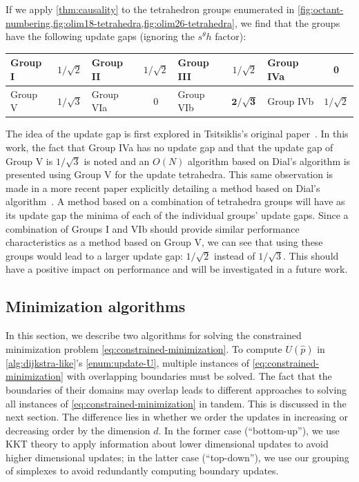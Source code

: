 \documentclass[eikonal.tex]{subfiles}
\begin{document}
If we apply \cref{thm:causality} to the tetrahedron groups enumerated
in
\cref{fig:octant-numbering,fig:olim18-tetrahedra,fig:olim26-tetrahedra},
we find that the groups have the following update gaps (ignoring the
$s^\theta h$ factor):
\vspace{0.5em}
\begin{center}
  \begin{tabular}{lc|lc|lc|lc}
    Group I & $1/\sqrt{2}$ & Group II & $1/\sqrt{2}$ & Group III & $1/\sqrt{2}$ & Group IVa & 0 \\
    \midrule
    Group V & $1/\sqrt{3}$ & Group VIa & 0 & Group VIb & $\boldsymbol{2/\sqrt{3}}$ & Group IVb & $1/\sqrt{2}$
  \end{tabular}
\end{center}
\vspace{0.5em} The idea of the update gap is first explored in
Tsitsiklis's original paper~\cite{tsitsiklis1995efficient}. In this
work, the fact that Group IVa has no update gap and that the update
gap of Group V is $1/\sqrt{3}$ is noted and an $O(N)$ algorithm based
on Dial's algorithm is presented using Group V for the update
tetrahedra. This same observation is made in a more recent paper
explicitly detailing a method based on Dial's
algorithm~\cite{kim2001calo}. A method based on a combination of
tetrahedra groups will have as its update gap the minima of each of
the individual groups' update gaps. Since a combination of Groups I
and VIb should provide similar performance characteristics as a method
based on Group V, we can see that using these groups would lead to a
larger update gap: $1/\sqrt{2}$ instead of $1/\sqrt{3}$. This should
have a positive impact on performance and will be investigated in a
future work.

\subsection[Optimization algorithms]{Minimization algorithms}

In this section, we describe two algorithms for solving the
constrained minimization problem
\cref{eq:constrained-minimization}. To compute $U(\hat{p})$ in
\cref{alg:dijkstra-like}'s \cref{enum:update-U}, multiple instances of
\cref{eq:constrained-minimization} with overlapping boundaries must be
solved. The fact that the boundaries of their domains may overlap
leads to different approaches to solving all instances of
\cref{eq:constrained-minimization} in tandem. This is discussed in the
next section. The difference lies in whether we order the updates in
increasing or decreasing order by the dimension $d$. In the former
case (``bottom-up''), we use KKT theory to apply information about
lower dimensional updates to avoid higher dimensional updates; in the
latter case (``top-down''), we use our grouping of simplexes to avoid
redundantly computing boundary updates.
\end{document}
